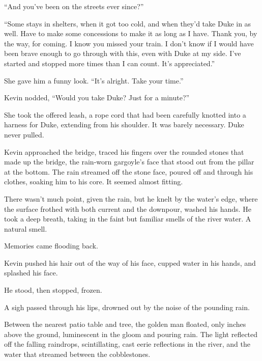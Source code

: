 ``And you've been on the streets ever since?''



``Some stays in shelters, when it got too cold, and when they'd take Duke in as well.  Have to make some concessions to make it as long as I have.  Thank you, by the way, for coming.  I know you missed your train.  I don't know if I would have been brave enough to go through with this, even with Duke at my side.  I've started and stopped more times than I can count.  It's appreciated.''



She gave him a funny look.  ``It's alright.  Take your time.''



Kevin nodded, ``Would you take Duke?  Just for a minute?''



She took the offered leash, a rope cord that had been carefully knotted into a harness for Duke, extending from his shoulder.  It was barely necessary.  Duke never pulled.



Kevin approached the bridge, traced his fingers over the rounded stones that made up the bridge, the rain-worn gargoyle's face that stood out from the pillar at the bottom.  The rain streamed off the stone face, poured off and through his clothes, soaking him to his core.  It seemed almost fitting.



There wasn't much point, given the rain, but he knelt by the water's edge, where the surface frothed with both current and the downpour, washed his hands.  He took a deep breath, taking in the faint but familiar smells of the river water.  A natural smell.



Memories came flooding back.



Kevin pushed his hair out of the way of his face, cupped water in his hands, and splashed his face.



He stood, then stopped, frozen.



A sigh passed through his lips, drowned out by the noise of the pounding rain.



Between the nearest patio table and tree, the golden man floated, only inches above the ground, luminescent in the gloom and pouring rain.  The light reflected off the falling raindrops, scintillating, cast eerie reflections in the river, and the water that streamed between the cobblestones.




